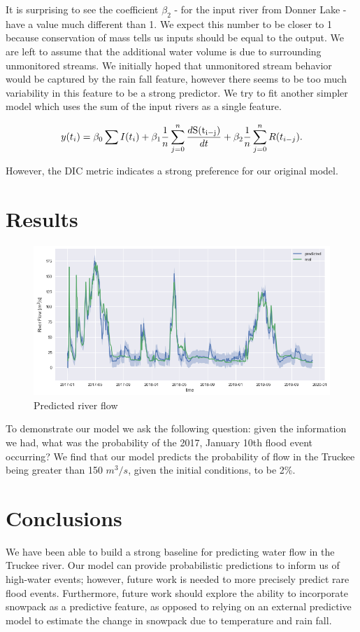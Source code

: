 \documentclass[11pt]{article}
\begin{document}
It is surprising to see the coefficient $\beta_2$ - for the input river from Donner Lake - have a value much different than 1. We expect this number to be closer to 1 because conservation of mass tells us inputs should be equal to the output. We are left to assume that the additional water volume is due to surrounding unmonitored streams. We initially hoped that unmonitored stream behavior would be captured by the rain fall feature, however there seems to be too much variability in this feature to be a strong predictor. We try to fit another simpler model which uses the sum of the input rivers as a single feature.

$$
y(t_i) = \beta_0 \sum I(t_i) + \beta_1 \frac{1}{n} \sum_{j{=}0}^n  \frac{d {\rm S(t_{i-j})}}{dt} + \beta_2  \frac{1}{n} \sum_{j{=}0}^n R(t_{i - j}).
$$

\noindent
However, the DIC metric indicates a strong preference for our original model.

\section{Results}

\begin{figure}[h]
\centering\includegraphics[width=\linewidth]{flow.png}
\caption{Predicted river flow}
\label{Fig. 4}
\end{figure}

To demonstrate our model we ask the following question: given the information we had, what was the probability of the 2017, January 10th flood event occurring? We find that our model predicts the probability of flow in the Truckee being greater than 150 $m^3/s$, given the initial conditions, to be 2\%. 

\section{Conclusions}

We have been able to build a strong baseline for predicting water flow in the Truckee river. Our model can provide probabilistic predictions to inform us of high-water events; however, future work is needed to more precisely predict rare flood events. Furthermore, future work should explore the ability to incorporate snowpack as a predictive feature, as opposed to relying on an external predictive model to estimate the change in snowpack due to temperature and rain fall.



\end{document}

